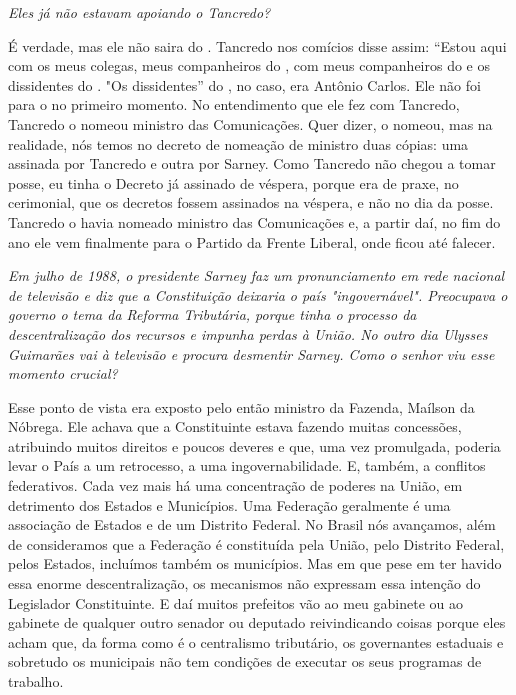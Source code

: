 \medskip

\emph{Eles já não estavam apoiando o Tancredo?}

É verdade, mas ele não saira do . Tancredo nos
comícios disse assim: ``Estou aqui com os meus colegas, meus
companheiros do , com meus companheiros do  e os dissidentes do
. "Os dissidentes'' do , no caso, era Antônio Carlos. Ele não foi
para o  no primeiro momento. No entendimento que ele fez com
Tancredo, Tancredo o nomeou ministro das Comunicações. Quer dizer, o
nomeou, mas na realidade, nós temos no decreto de nomeação de ministro
duas cópias: uma assinada por Tancredo e outra por Sarney. Como Tancredo
não chegou a tomar posse, eu tinha o Decreto já assinado de véspera,
porque era de praxe, no cerimonial, que os decretos fossem assinados na
véspera, e não no dia da posse. Tancredo o havia nomeado ministro das
Comunicações e, a partir daí, no fim do ano ele vem finalmente para o
Partido da Frente Liberal, onde ficou até falecer.

\medskip

\emph{Em julho de 1988, o presidente Sarney faz um pronunciamento em
rede nacional de televisão e diz que a Constituição deixaria o país
"ingovernável". Preocupava o governo o tema da Reforma Tributária,
porque tinha o processo da descentralização dos recursos e impunha
perdas à União. No outro dia Ulysses Guimarães vai à televisão e procura
desmentir Sarney. Como o senhor viu esse momento crucial? }

Esse ponto de vista era exposto pelo então ministro da
Fazenda, Maílson da Nóbrega. Ele achava que a Constituinte estava
fazendo muitas concessões, atribuindo muitos direitos e poucos deveres e
que, uma vez promulgada, poderia levar o País a um retrocesso, a uma
ingovernabilidade. E, também, a conflitos federativos. Cada vez mais há
uma concentração de poderes na União, em detrimento dos Estados e
Municípios. Uma Federação geralmente é uma associação de Estados e de um
Distrito Federal. No Brasil nós avançamos, além de consideramos que a
Federação é constituída pela União, pelo Distrito Federal, pelos
Estados, incluímos também os municípios. Mas em que pese em ter havido
essa enorme descentralização, os mecanismos não expressam essa intenção
do Legislador Constituinte. E daí muitos prefeitos vão ao meu gabinete
ou ao gabinete de qualquer outro senador ou deputado reivindicando
coisas porque eles acham que, da forma como é o centralismo tributário,
os governantes estaduais e sobretudo os municipais não tem condições de
executar os seus programas de trabalho.

